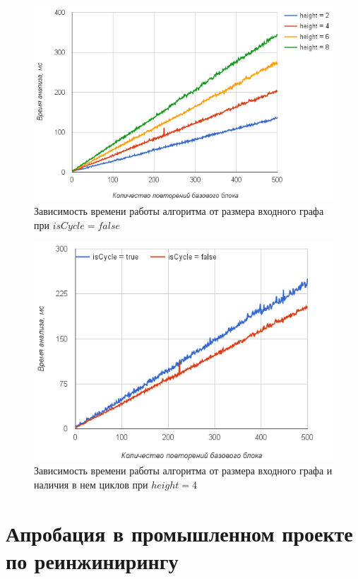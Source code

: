 \begin{figure}[h!]
 \centering
 \includegraphics[width=15cm]{pics/diffheights.png}
 \caption{Зависимость времени работы алгоритма от размера входного графа при $isCycle=false$}
 \label{diffheights}
\end{figure}

\begin{figure}[h!]
 \centering
 \includegraphics[width=15cm]{pics/heigh4.png}
 \caption{Зависимость времени работы алгоритма от размера входного графа и наличия в нем циклов при $height=4$}
 \label{CycleVsLinear}
\end{figure}

\section{Апробация в промышленном проекте по реинжинирингу}

